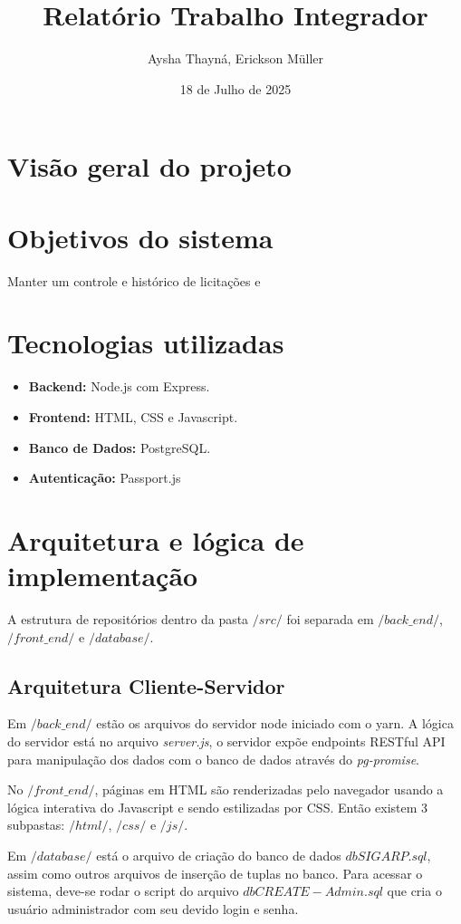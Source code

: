 \documentclass[ ]{article}
\title{Relatório Trabalho Integrador}
\date{18 de Julho de 2025}
\author{Aysha Thayná, Erickson Müller}
\begin{document}
	\maketitle
	\newpage
	\section{Visão geral do projeto}
	\section{Objetivos do sistema}
		Manter um controle e histórico de licitações e 
	\section{Tecnologias utilizadas}
		\begin{itemize}
			\item \textbf{Backend:} Node.js com Express.
			\item \textbf{Frontend:} HTML, CSS e Javascript.
			\item \textbf{Banco de Dados:} PostgreSQL.
			\item \textbf{Autenticação:} Passport.js
		\end{itemize}
	\section{Arquitetura e lógica de implementação}
		A estrutura de repositórios dentro da pasta $/src/$ foi separada em $/back\_end/$, $/front\_end/$ e $/database/$. 
		\subsection{Arquitetura Cliente-Servidor}
			Em $/back\_end/$ estão os arquivos do servidor node iniciado com o yarn. A lógica do servidor está no arquivo \textit{server.js}, o servidor expõe endpoints RESTful API para manipulação dos dados com o banco de dados através do \textit{pg-promise}.
			
			No $/front\_end/$, páginas em HTML são renderizadas pelo navegador usando a lógica interativa do Javascript e sendo estilizadas por CSS. Então existem 3 subpastas: $/html/$, $/css/$ e $/js/$.
			
			Em $/database/$ está o arquivo de criação do banco de dados $dbSIGARP.sql$, assim como outros arquivos de inserção de tuplas no banco. Para acessar o sistema, deve-se rodar o script do arquivo $dbCREATE-Admin.sql$ que cria o usuário administrador com seu devido login e senha.
			
\end{document}
